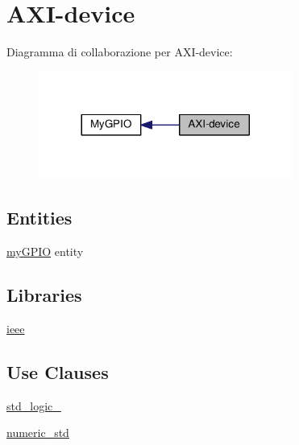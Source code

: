 \hypertarget{group___a_x_i-device}{\section{A\+X\+I-\/device}
\label{group___a_x_i-device}
}
Diagramma di collaborazione per A\+X\+I-\/device\+:\nopagebreak
\begin{figure}[H]
\begin{center}
\leavevmode
\includegraphics[width=236pt]{group___a_x_i-device}
\end{center}
\end{figure}
\subsection*{Entities}
\begin{DoxyCompactItemize}
\item 
\hyperlink{classmy_g_p_i_o}{my\+G\+P\+I\+O} entity
\end{DoxyCompactItemize}
\subsection*{Libraries}
 \begin{DoxyCompactItemize}
\item 
\hypertarget{group___a_x_i-device_ga0a6af6eef40212dbaf130d57ce711256}{\hyperlink{group___a_x_i-device_ga0a6af6eef40212dbaf130d57ce711256}{ieee} }\label{group___a_x_i-device_ga0a6af6eef40212dbaf130d57ce711256}

\end{DoxyCompactItemize}
\subsection*{Use Clauses}
 \begin{DoxyCompactItemize}
\item 
\hypertarget{group___a_x_i-device_gacd03516902501cd1c7296a98e22c6fcb}{\hyperlink{group___a_x_i-device_gacd03516902501cd1c7296a98e22c6fcb}{std\+\_\+logic\+\_}   }\label{group___a_x_i-device_gacd03516902501cd1c7296a98e22c6fcb}

\item 
\hypertarget{group___a_x_i-device_ga2edc34402b573437d5f25fa90ba4013e}{\hyperlink{group___a_x_i-device_ga2edc34402b573437d5f25fa90ba4013e}{numeric\+\_\+std}   }\label{group___a_x_i-device_ga2edc34402b573437d5f25fa90ba4013e}

\end{DoxyCompactItemize}
